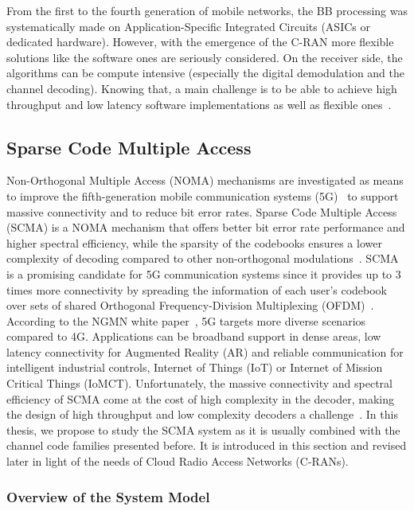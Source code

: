 From the first to the fourth generation of mobile networks, the BB processing
was systematically made on Application-Specific Integrated Circuits (ASICs or
dedicated hardware). However, with the emergence of the C-RAN more flexible
solutions like the software ones are seriously considered. On the receiver side,
the algorithms can be compute intensive (especially the digital demodulation and
the channel decoding). Knowing that, a main challenge is to be able to achieve
high throughput and low latency software implementations as well as flexible
ones~\cite{Nikaein2015,Rodriguez2017}.

\subsection{Sparse Code Multiple Access}
\label{sec:ctx_scma}

Non-Orthogonal Multiple Access (NOMA) mechanisms are investigated as means to
improve the fifth-generation mobile communication systems (5G)~\cite{Islam2017}
to support massive connectivity and to reduce bit error rates. Sparse Code
Multiple Access (SCMA) is a NOMA mechanism that offers better bit error rate
performance and higher spectral efficiency, while the sparsity of the codebooks
ensures a lower complexity of decoding compared to other non-orthogonal
modulations~\cite{Nikopour2013}. SCMA is a promising candidate for 5G
communication systems since it provides up to 3 times more connectivity by
spreading the information of each user's codebook over sets of shared Orthogonal
Frequency-Division Multiplexing (OFDM)~\cite{Altera2015}. According to the NGMN
white paper~\cite{Alliance2015}, 5G targets more diverse scenarios compared to
4G. Applications can be broadband support in dense areas, low latency
connectivity for Augmented Reality (AR) and reliable communication for
intelligent industrial controls, Internet of Things (IoT) or Internet of Mission
Critical Things (IoMCT). Unfortunately, the massive connectivity and spectral
efficiency of SCMA come at the cost of high complexity in the decoder, making
the design of high throughput and low complexity decoders a
challenge~\cite{Lu2015}. In this thesis, we propose to study the SCMA system
as it is usually combined with the channel code families presented before.
It is introduced in this section and revised later in light of the needs of
Cloud Radio Access Networks (C-RANs).

\subsubsection{Overview of the System Model}
\label{sec:ctx_scma_overview}

